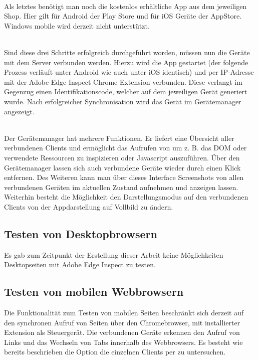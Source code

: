 		\\Als letztes benötigt man noch die kostenlos erhältliche \Gls{App} aus dem jeweiligen Shop. Hier gilt für Android der Play Store und für iOS Geräte der \Gls{App}Store. Windows mobile wird derzeit nicht unterstützt.
		
		\\Sind diese drei Schritte erfolgreich durchgeführt worden, müssen nun die Geräte mit dem Server verbunden werden. Hierzu wird die \Gls{App} gestartet (der folgende Prozess verläuft unter Android wie auch unter iOS identisch) und per IP-Adresse mit der Adobe Edge Inspect Chrome Extension verbunden. Diese verlangt im Gegenzug einen Identifikationscode, welcher auf dem jeweiligen Gerät generiert wurde. Nach erfolgreicher Synchronisation wird das Gerät im Gerätemanager angezeigt.

		\\Der Gerätemanager hat mehrere Funktionen. Er liefert eine Übersicht aller verbundenen Clients und ermöglicht das Aufrufen von  um z. B. das \Gls{DOM} oder verwendete Ressourcen zu inspizieren oder \Gls{Javascript} auszuführen. Über den Gerätemanager lassen sich auch verbundene Geräte wieder durch einen Klick entfernen. Des Weiteren kann man über dieses Interface Screenshots von allen verbundenen Geräten im aktuellen Zustand aufnehmen und anzeigen lassen. Weiterhin besteht die Möglichkeit den Darstellungsmodus auf den verbundenen Clients von der \Gls{App}darstellung auf Vollbild zu ändern.
		
		\subsection{Testen von Desktopbrowsern}
		Es gab zum Zeitpunkt der Erstellung dieser Arbeit keine Möglichkeiten Desktopseiten mit Adobe Edge Inspect zu testen.
		
		\subsection{Testen von mobilen \Gls{Webbrowser}n}
		Die Funktionalität zum Testen von mobilen Seiten beschränkt sich derzeit auf den synchronen Aufruf von Seiten über den Chromebrowser, mit installierter Extension als Steuergerät. Die verbundenen Geräte erkennen den Aufruf von Links und das Wechseln von Tabs innerhalb des \Gls{Webbrowser}s. Es besteht wie bereits beschrieben die Option die einzelnen Clients per  zu untersuchen.
		

